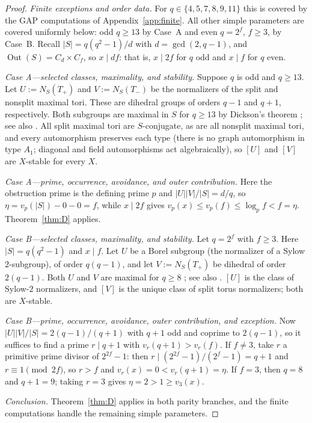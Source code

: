 \documentclass[11pt]{amsart}
\theoremstyle{definition}
\theoremstyle{remark}
\DeclareMathOperator{\Out}{Out}
\newcommand{\vp}[1]{v_{#1}}
\begin{document}
\begin{proof}
\emph{Finite exceptions and order data.}
For $q\in\{4,5,7,8,9,11\}$ this is covered by
the GAP computations of Appendix~\ref{app:finite}. All other simple parameters are covered
uniformly below: odd $q\geq13$ by Case~A and even $q=2^f$, $f\geq3$, by
Case~B. Recall
$|S|=q(q^2-1)/d$ with $d=\gcd(2,q-1)$, and
$\Out(S)=C_d\times C_f$, so $x\mid df$: that is, $x\mid2f$ for $q$ odd
and $x\mid f$ for $q$ even.

\emph{Case A---selected classes, maximality, and stability.}
Suppose $q$ is odd and $q\geq13$. Let $U:=N_S(T_+)$ and $V:=N_S(T_-)$
be the normalizers of the split and nonsplit maximal tori. These are dihedral
groups of orders $q-1$ and $q+1$, respectively. Both subgroups are maximal in $S$
for $q\geq13$ by Dickson's theorem \cite{Dickson,Huppert}; see also
\cite[Tables~8.1--8.2, p.~376, and Table~8.7, p.~380]{BHRD}.
All split maximal tori are $S$-conjugate, as are all nonsplit maximal
tori, and every automorphism preserves each type (there is no
graph automorphism in type $A_1$; diagonal and field automorphisms act
algebraically), so $[U]$ and $[V]$ are $X$-stable for every $X$.

\emph{Case A---prime, occurrence, avoidance, and outer contribution.}
Here the obstruction prime is the defining prime $p$ and
$|U||V|/|S|=d/q$, so
$\eta=\vp{p}(|S|)-0-0=f$, while $x\mid2f$ gives
$\vp{p}(x)\leq\vp{p}(f)\leq\log_pf<f=\eta$. Theorem~\ref{thm:D} applies.

\emph{Case B---selected classes, maximality, and stability.}
Let $q=2^f$ with $f\geq3$. Here $|S|=q(q^2-1)$ and $x\mid f$.
Let $U$ be a Borel subgroup (the normalizer of a Sylow $2$-subgroup), of
order $q(q-1)$, and let $V:=N_S(T_+)$ be dihedral of order $2(q-1)$.
Both $U$ and $V$ are maximal for $q\geq8$ \cite{Dickson,Huppert}; see also
\cite[Tables~8.1--8.2, p.~376]{BHRD}. $[U]$ is the class of Sylow-$2$
normalizers, and $[V]$ is the unique class of split torus normalizers;
both are $X$-stable.

\emph{Case B---prime, occurrence, avoidance, outer contribution, and exception.}
Now $|U||V|/|S|=2(q-1)/(q+1)$ with $q+1$ odd and coprime to
$2(q-1)$, so it suffices to find a prime $r\mid q+1$ with
$\vp{r}(q+1)>\vp{r}(f)$. If $f\neq3$, take $r$ a primitive prime divisor
of $2^{2f}-1$: then $r\mid(2^{2f}-1)/(2^f-1)=q+1$ and
$r\equiv1\pmod{2f}$, so $r>f$ and
$\vp{r}(x)=0<\vp{r}(q+1)=\eta$. If $f=3$, then $q=8$ and
$q+1=9$; taking $r=3$ gives $\eta=2>1\geq\vp{3}(x)$.

\emph{Conclusion.} Theorem~\ref{thm:D} applies in both parity branches,
and the finite computations handle the remaining simple parameters.
\end{proof}
\end{document}
